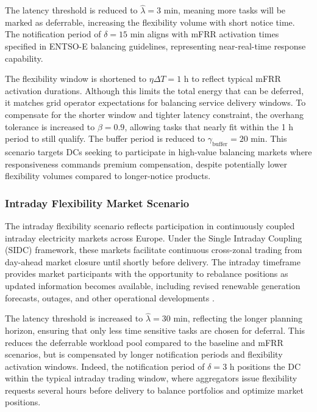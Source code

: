 \documentclass[preprint,12pt]{elsarticle}
\begin{document}
The latency threshold is reduced to $\hat{\lambda} = 3$ min, meaning more tasks will be marked as deferrable, increasing the flexibility volume with short notice time. The notification period of $\delta = 15$ min aligns with mFRR activation times specified in ENTSO-E balancing guidelines, representing near-real-time response capability.

The flexibility window is shortened to $\eta\Delta T = 1$ h to reflect typical mFRR activation durations. Although this limits the total energy that can be deferred, it matches grid operator expectations for balancing service delivery windows. To compensate for the shorter window and tighter latency constraint, the overhang tolerance is increased to $\beta = 0.9$, allowing tasks that nearly fit within the 1 h period to still qualify. The buffer period is reduced to $\gamma_{\text{buffer}} = 20$ min. This scenario targets DCs seeking to participate in high-value balancing markets where responsiveness commands premium compensation, despite potentially lower flexibility volumes compared to longer-notice products.

\subsubsection{Intraday Flexibility Market Scenario}

The intraday flexibility scenario reflects participation in continuously coupled intraday electricity markets across Europe. Under the Single Intraday Coupling (SIDC) framework, these markets facilitate continuous cross-zonal trading from day-ahead market closure until shortly before delivery. The intraday timeframe provides market participants with the opportunity to rebalance positions as updated information becomes available, including revised renewable generation forecasts, outages, and other operational developments \cite{ENTSOE_Market_Report_2024}.

The latency threshold is increased to $\hat{\lambda} = 30$ min, reflecting the longer planning horizon, ensuring that only less time sensitive tasks are chosen for deferral. This reduces the deferrable workload pool compared to the baseline and mFRR scenarios, but is compensated by longer notification periods and flexibility activation windows. Indeed, the notification period of $\delta = 3$ h positions the DC within the typical intraday trading window, where aggregators issue flexibility requests several hours before delivery to balance portfolios and optimize market positions.
\end{document}
